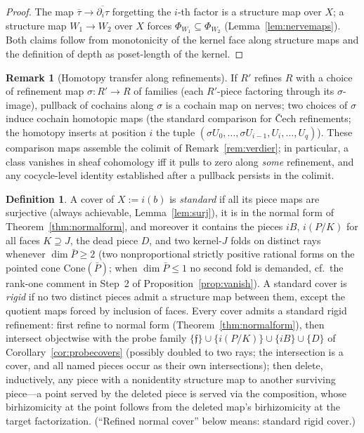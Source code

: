 \documentclass[11pt]{article}
\theoremstyle{definition}
\newtheorem{definition}[theorem]{Definition}
\newtheorem{remark}[theorem]{Remark}
\newcommand{\Cone}{\mathrm{Cone}}
\begin{document}
\begin{proof}
The map $\overline\tau\to\overline{\partial_i\tau}$ forgetting the
$i$-th factor is a structure map over $X$; a structure map
$W_1\to W_2$ over $X$ forces $\Phi_{W_1}\subseteq\Phi_{W_2}$
(Lemma~\ref{lem:nervemaps}). Both claims follow from
monotonicity of the kernel face along structure maps and the
definition of depth as poset-length of the kernel.
\end{proof}

\begin{remark}[Homotopy transfer along refinements]\label{rem:transfer}
If $R'$ refines $R$ with a choice of refinement map
$\sigma:R'\to R$ of families (each $R'$-piece factoring through
its $\sigma$-image), pullback of cochains along $\sigma$ is a
cochain map on nerves; two choices of $\sigma$ induce cochain
homotopic maps \textup{(}the standard comparison for \v{C}ech
refinements; the homotopy inserts at position $i$ the tuple
$(\sigma U_0,\dots,\sigma U_{i-1},U_i,\dots,U_q)$\textup{)}.
These comparison maps assemble the colimit of
Remark~\ref{rem:verdier}; in particular, a class vanishes in
sheaf cohomology iff it pulls to zero along \emph{some}
refinement, and any cocycle-level identity established after a
pullback persists in the colimit.
\end{remark}

\begin{definition}\label{def:square}
A cover of $X:=i(b)$ is \emph{standard} if all its piece maps are
surjective \textup{(}always achievable,
Lemma~\ref{lem:surj}\textup{)}, it is in the normal
form of Theorem~\ref{thm:normalform}, and moreover it contains the
pieces $iB$, $i(P/K)$ for all faces $K\supseteq J$, the dead
piece $D$, and two kernel-$J$ folds on distinct rays whenever
$\dim\bar P\ge2$ \textup{(}two nonproportional strictly positive
rational forms on the pointed cone $\Cone(\bar P)$; when
$\dim\bar P\le1$ no second fold is demanded, cf.\ the rank-one
comment in Step~2 of Proposition~\ref{prop:vanish}\textup{)}.
A standard cover is \emph{rigid} if no two distinct pieces admit
a structure map between them, except the quotient maps forced by
inclusion of faces. Every cover admits a standard rigid
refinement: first refine to normal form
(Theorem~\ref{thm:normalform}), then intersect objectwise with
the probe family $\{\mathfrak f\}\cup\{i(P/K)\}\cup\{iB\}\cup
\{D\}$ of Corollary~\ref{cor:probecovers}
\textup{(}possibly doubled to two rays; the intersection is a
cover, and all named pieces occur as their own
intersections\textup{)}; then delete, inductively, any piece with
a nonidentity structure map to another surviving piece---a point
served by the deleted piece is served via the composition, whose
birhizomicity at the point follows from the deleted map's
birhizomicity at the target factorization.
\textup{(}``Refined normal cover'' below means: standard rigid
cover.\textup{)}
\end{definition}
\end{document}
